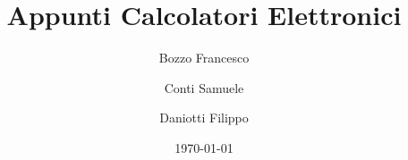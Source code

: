 \documentclass[a4paper,12pt]{book}
\begin{document}
\author{Bozzo Francesco \and Conti Samuele \and Daniotti Filippo}
\title{Appunti Calcolatori Elettronici}
\date{\today}

\frontmatter
\maketitle
\tableofcontents

\mainmatter






\backmatter
\end{document}
